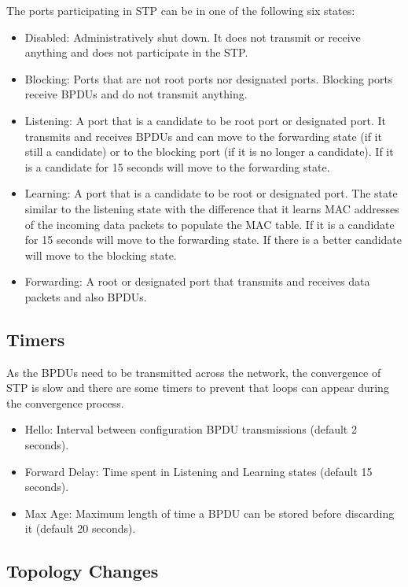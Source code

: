 The ports participating in STP can be in one of the following six states:
\begin{itemize}
\item Disabled: Administratively shut down. It does not transmit or receive anything and does not participate in the STP.
\item Blocking: Ports that are not root ports nor designated ports.
Blocking ports receive BPDUs and do not transmit anything.
\item Listening: A port that is a candidate to be root port or designated port. 
It transmits and receives BPDUs and can move to the forwarding state (if it still a candidate) or to the blocking port (if it is no longer a candidate).
If it is a candidate for 15 seconds will move to the forwarding state.
\item Learning: A port that is a candidate to be root or designated port.
The state similar to the listening state with the difference that it learns MAC addresses of the incoming data packets to populate the MAC table.
If it is a candidate for 15 seconds will move to the forwarding state.
If there is a better candidate will move to the blocking state.
\item Forwarding: A root or designated port that transmits and receives data packets and also BPDUs.
\end{itemize}

\subsection{Timers}

As the BPDUs need to be transmitted across the network, the convergence of STP is slow and there are some timers to prevent that loops can appear during the convergence process.

\begin{itemize}
\item Hello: Interval between configuration BPDU transmissions (default 2 seconds).
\item Forward Delay: Time spent in Listening and Learning states (default 15 seconds).
\item Max Age: Maximum length of time a BPDU can be stored before discarding it (default 20 seconds).
\end{itemize}

\subsection{Topology Changes}

